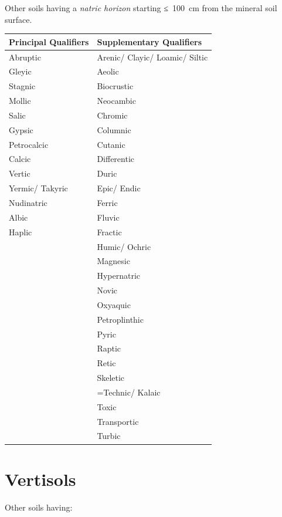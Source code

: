 \documentclass[
  letterpaper,
  DIV=11,
  numbers=noendperiod]{scrreprt}
\begin{document}
Other soils having a \emph{natric horizon} starting ≤~100~cm from the
mineral soil surface.

\begin{longtable}[]{@{}ll@{}}
\toprule()
Principal Qualifiers & Supplementary Qualifiers \\
\midrule()
\endhead
Abruptic & Arenic/ Clayic/ Loamic/ Siltic \\
Gleyic & Aeolic \\
Stagnic & Biocrustic \\
Mollic & Neocambic \\
Salic & Chromic \\
Gypsic & Columnic \\
Petrocalcic & Cutanic \\
Calcic & Differentic \\
Vertic & Duric \\
Yermic/ Takyric & Epic/ Endic \\
Nudinatric & Ferric \\
Albic & Fluvic \\
Haplic & Fractic \\
& Humic/ Ochric \\
& Magnesic \\
& Hypernatric \\
& Novic \\
& Oxyaquic \\
& Petroplinthic \\
& Pyric \\
& Raptic \\
& Retic \\
& Skeletic \\
& =Technic/ Kalaic \\
& Toxic \\
& Transportic \\
& Turbic \\
\bottomrule()
\end{longtable}


\hypertarget{key-vertisols}{%
\chapter{Vertisols}\label{key-vertisols}}

Other soils having:
\end{document}
